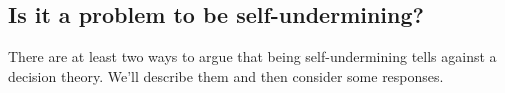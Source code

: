 \documentclass[a4paper]{article}
\newenvironment{CCM rewritten}
{\begingroup\color{blue}} %
{\endgroup}              %
\begin{document}




%


\subsection{Is it a problem to be self-undermining?}\label{sect:reu:phil-discussion}

There are at least two ways to argue that being self-undermining tells against a decision theory. We'll describe them and then consider some responses.
\end{document}
